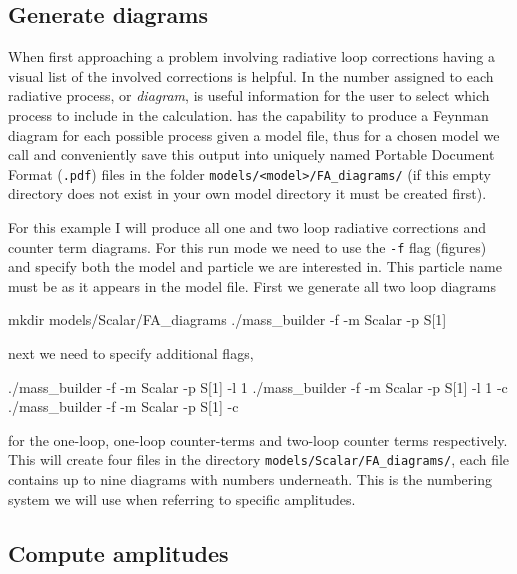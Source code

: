 \subsection{Generate \feynarts diagrams}\label{generate_diagrams}

When first approaching a problem involving radiative loop corrections having a visual list of the involved corrections is helpful.  In \mb the number assigned to each radiative process, or \textit{diagram}, is useful information for the user to select which process to include in the calculation.  \feynarts has the capability to produce a Feynman diagram for each possible process given a model file, thus for a chosen model we call \feynarts and conveniently save this output into uniquely named Portable Document Format (\lstinline{.pdf}) files in the folder \lstinline{models/<model>/FA_diagrams/} (if this empty directory does not exist in your own model directory it must be created first).

For this example I will produce all one and two loop radiative corrections and counter term diagrams.  For this run mode we need to use the \lstinline{-f} flag (figures) and specify both the model and particle we are interested in.  This particle name must be as it appears in the \feynarts model file.  First we generate all two loop diagrams
\begin{lstterm}
mkdir models/Scalar/FA_diagrams
./mass_builder -f -m Scalar -p S[1]
\end{lstterm}
next we need to specify additional flags,
\begin{lstterm}
./mass_builder -f -m Scalar -p S[1] -l 1
./mass_builder -f -m Scalar -p S[1] -l 1 -c
./mass_builder -f -m Scalar -p S[1] -c
\end{lstterm}
for the one-loop, one-loop counter-terms and two-loop counter terms respectively.  This will create four files in the directory \lstinline{models/Scalar/FA_diagrams/}, each file contains up to nine diagrams with numbers underneath.  This is the numbering system we will use when referring to specific amplitudes.

\subsection{Compute amplitudes}

